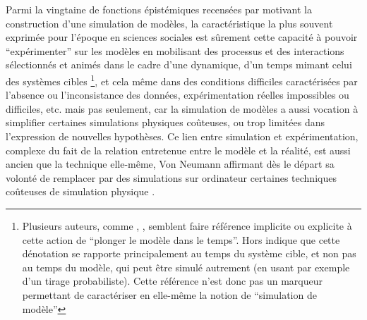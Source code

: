 Parmi la vingtaine de fonctions épistémiques recensées par \textcite[14-23]{Varenne2013} motivant la construction d'une simulation de modèles, la caractéristique la plus souvent exprimée pour l'époque en sciences sociales est sûrement cette capacité à pouvoir \enquote{expérimenter} sur les modèles en mobilisant des processus et des interactions sélectionnés et animés dans le cadre d'une dynamique, d'un temps mimant celui des systèmes cibles \footnote{Plusieurs auteurs, comme \autocite[462]{Gullahorn1965}, \autocite[296]{Doran1970}, \autocite[294-295]{Batty1976} semblent faire référence implicite ou explicite à cette action de \enquote{plonger le modèle dans le temps}. Hors \autocite[31]{Varenne2013} indique que cette dénotation se rapporte principalement au temps du système cible, et non pas au temps du modèle, qui peut être simulé autrement (en usant par exemple d'un tirage probabiliste). Cette référence n'est donc pas un marqueur permettant de caractériser en elle-même la notion de \enquote{simulation de modèle}}, et cela même dans des conditions difficiles caractérisées par l'absence ou l'inconsistance des données, expérimentation réelles impossibles ou difficiles, etc. mais pas seulement, car la simulation de modèles a aussi vocation à simplifier certaines simulations physiques coûteuses, ou trop limitées dans l'expression de nouvelles hypothèses. Ce lien entre simulation et expérimentation, complexe du fait de la relation entretenue entre le modèle et la réalité, est aussi ancien que la technique elle-même, Von Neumann affirmant dès le départ sa volonté de remplacer par des simulations sur ordinateur certaines techniques coûteuses de simulation physique \autocite[15]{Winsberg2013}.


